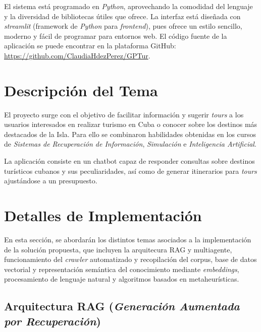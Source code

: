 \documentclass[10pt]{llncs}
\begin{document}
El sistema está programado en \textit{Python}, aprovechando la comodidad del lenguaje y la diversidad de bibliotecas útiles que ofrece. La interfaz está diseñada con \textit{streamlit} (framework de \textit{Python} para \textit{frontend}), 
pues ofrece un estilo sencillo, moderno y fácil de programar para entornos web. El código fuente de la aplicación se puede encontrar en 
la plataforma GitHub: \href{https://github.com/ClaudiaHdezPerez/GPTur}{\color{blue}https://github.com/ClaudiaHdezPerez/GPTur}.

\section{Descripción del Tema}\label{sec:descripcion}

El proyecto surge con el objetivo de facilitar información y sugerir \textit{tours} a los usuarios interesados en realizar turismo en Cuba
o conocer sobre los destinos más destacados de la Isla. Para ello se combinaron habilidades obtenidas en los cursos de \textit{Sistemas de 
Recuperación de Información}, \textit{Simulación} e \textit{Inteligencia Artificial}.

La aplicación consiste en un chatbot capaz de responder consultas sobre destinos turísticos cubanos y sus peculiaridades, así como de generar itinerarios para \textit{tours} ajustándose a un presupuesto.

\section{Detalles de Implementación}\label{sec:implementacion}

En esta sección, se abordarán los distintos temas asociados a la implementación de la solución propuesta, que incluyen la arquitecura RAG y multiagente, funcionamiento del \textit{crawler} automatizado y recopilación del corpus, base de datos vectorial y representación semántica del 
conocimiento mediante \textit{embeddings}, procesamiento de lenguaje natural y algoritmos basados en metaheurísticas. 

\vspace{\baselineskip}

\subsection{Arquitectura RAG (\textit{Generación Aumentada por Recuperación})}\label{sec:rag}
\end{document}
